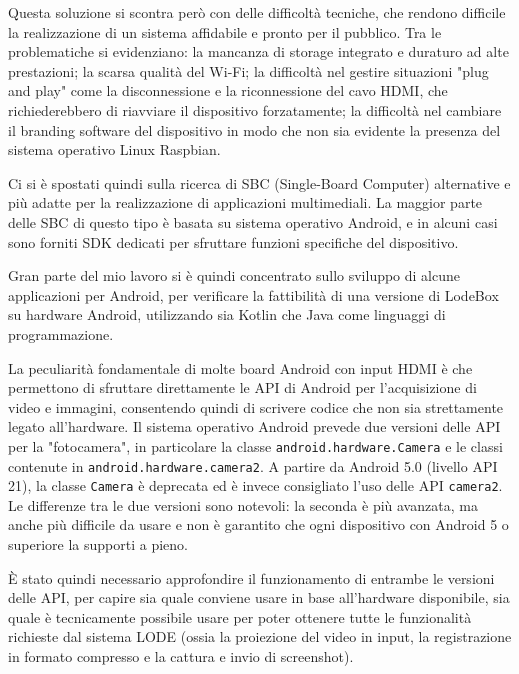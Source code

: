 Questa soluzione si scontra però con delle difficoltà tecniche, che rendono difficile la realizzazione di un sistema affidabile e pronto per il pubblico. Tra le problematiche si evidenziano: la mancanza di storage integrato e duraturo ad alte prestazioni; la scarsa qualità del Wi-Fi; la difficoltà nel gestire situazioni "plug and play" come la disconnessione e la riconnessione del cavo HDMI, che richiederebbero di riavviare il dispositivo forzatamente; la difficoltà nel cambiare il branding software del dispositivo in modo che non sia evidente la presenza del sistema operativo Linux Raspbian.


Ci si è spostati quindi sulla ricerca di SBC (Single-Board Computer) alternative e più adatte per la realizzazione di applicazioni multimediali. La maggior parte delle SBC di questo tipo è basata su sistema operativo Android, e in alcuni casi sono forniti SDK dedicati per sfruttare funzioni specifiche del dispositivo.

Gran parte del mio lavoro si è quindi concentrato sullo sviluppo di alcune applicazioni per Android, per verificare la fattibilità di una versione di LodeBox su hardware Android, utilizzando sia Kotlin che Java come linguaggi di programmazione.

La peculiarità fondamentale di molte board Android con input HDMI è che permettono di sfruttare direttamente le API di Android per l'acquisizione di video e immagini, consentendo quindi di scrivere codice che non sia strettamente legato all'hardware. Il sistema operativo Android prevede due versioni delle API per la "fotocamera", in particolare la classe \texttt{android.hardware.Camera} e le classi contenute in \texttt{android.hardware.camera2}. A partire da Android 5.0 (livello API 21), la classe \texttt{Camera} è deprecata ed è invece consigliato l'uso delle API \texttt{camera2}. Le differenze tra le due versioni sono notevoli: la seconda è più avanzata, ma anche più difficile da usare e non è garantito che ogni dispositivo con Android 5 o superiore la supporti a pieno.

È stato quindi necessario approfondire il funzionamento di entrambe le versioni delle API, per capire sia quale conviene usare in base all'hardware disponibile, sia quale è tecnicamente possibile usare per poter ottenere tutte le funzionalità richieste dal sistema LODE (ossia la proiezione del video in input, la registrazione in formato compresso e la cattura e invio di screenshot).

